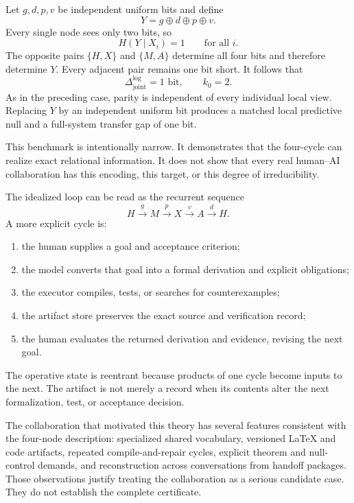 
Let \(g,d,p,v\) be independent uniform bits and define
\[
Y=g\oplus d\oplus p\oplus v.
\]
Every single node sees only two bits, so
\[
H(Y\mid X_i)=1
\qquad\text{for all }i.
\]
The opposite pairs \(\{H,X\}\) and \(\{M,A\}\) determine all four bits and
therefore determine \(Y\). Every adjacent pair remains one bit short. It
follows that
\[
\boxed{
\Delta_{\mathrm{joint}}^{\log}=1\text{ bit},
\qquad
k_0=2.
}
\]
As in the preceding case, parity is independent of every individual local
view. Replacing \(Y\) by an independent uniform bit produces a matched local
predictive null and a full-system transfer gap of one bit.

This benchmark is intentionally narrow. It demonstrates that the four-cycle
can realize exact relational information. It does not show that every real
human--AI collaboration has this encoding, this target, or this degree of
irreducibility.


The idealized loop can be read as the recurrent sequence
\[
\boxed{
H\xrightarrow{g}M
\xrightarrow{p}X
\xrightarrow{v}A
\xrightarrow{d}H.
}
\]
A more explicit cycle is:
\begin{enumerate}
\item the human supplies a goal and acceptance criterion;
\item the model converts that goal into a formal derivation and explicit
 obligations;
\item the executor compiles, tests, or searches for counterexamples;
\item the artifact store preserves the exact source and verification record;
\item the human evaluates the returned derivation and evidence, revising the
 next goal.
\end{enumerate}
The operative state is reentrant because products of one cycle become inputs to
the next. The artifact is not merely a record when its contents alter the next
formalization, test, or acceptance decision.


The collaboration that motivated this theory has several features consistent
with the four-node description: specialized shared vocabulary, versioned
LaTeX and code artifacts, repeated compile-and-repair cycles, explicit theorem
and null-control demands, and reconstruction across conversations from handoff
packages. Those observations justify treating the collaboration as a serious
candidate case. They do not establish the complete certificate.

